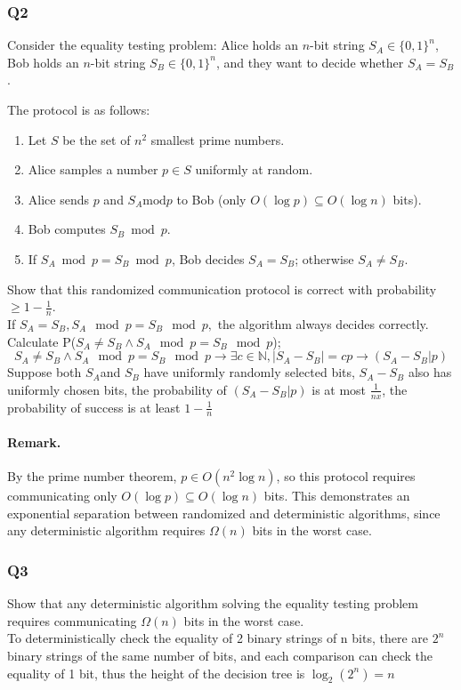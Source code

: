 \documentclass[9pt]{extarticle}
\begin{document}
\subsubsection*{Q2}
Consider the equality testing problem: Alice holds an $n$-bit string $S_A \in \{0,1\}^n$, Bob holds an $n$-bit string $S_B \in \{0,1\}^n$, and they want to decide whether $S_A = S_B$.  

The protocol is as follows:
\begin{enumerate}
    \item Let $S$ be the set of $n^2$ smallest prime numbers.
    \item Alice samples a number $p \in S$ uniformly at random.
    \item Alice sends $p$ and $S_A \text{mod} p$ to Bob (only $O(\log p) \subseteq O(\log n)$ bits).
    \item Bob computes $S_B \bmod p$.
    \item If $S_A \bmod p = S_B \bmod p$, Bob decides $S_A = S_B$; otherwise $S_A \neq S_B$.
\end{enumerate}

Show that this randomized communication protocol is correct with probability $\geq 1 - \tfrac{1}{n}$.\\
If $S_A = S_B, S_A \mod p = S_B \mod p,$ the algorithm always decides correctly. \\
Calculate P($S_A \neq S_B \land S_A \mod p = S_B \mod p$);
\[S_A \neq S_B \land S_A \mod p = S_B \mod p \rightarrow \exists c\in \mathbb{N}, |S_A - S_B| = cp \rightarrow (S_A -S_B | p)\]
Suppose both $S_A $and $S_B$ have uniformly randomly selected bits, $S_A - S_B$ also has uniformly chosen bits, the probability of 
$(S_A -S_B | p)$ is at most $\frac{1}{nx    }$, the probability of success is at least $1 - \frac{1}{n}$

\paragraph{Remark.} By the prime number theorem, $p \in O(n^2 \log n)$, so this protocol requires communicating only $O(\log p) \subseteq O(\log n)$ bits. This demonstrates an exponential separation between randomized and deterministic algorithms, since any deterministic algorithm requires $\Omega(n)$ bits in the worst case.

\subsubsection*{Q3}
Show that any deterministic algorithm solving the equality testing problem requires communicating $\Omega(n)$ bits in the worst case.\\
To deterministically check the equality of 2 binary strings of n bits, there are $2^n$ binary strings of the same number of bits, and each comparison can 
check the equality of 1 bit, thus the height of the decision tree is $\log_2(2^n) = n$
\end{document}
